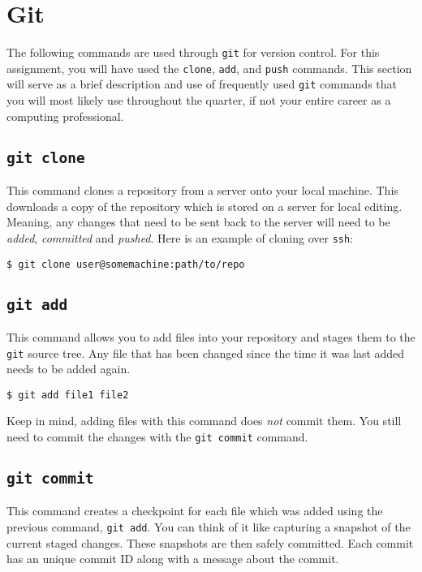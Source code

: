 \documentclass[11pt]{article}
\begin{document}
\section{Git}

The following commands are used through \texttt{git} for version control. For
this assignment, you will have used the \texttt{clone}, \texttt{add}, and
\texttt{push} commands. This section will serve as a brief description and use
of frequently used \texttt{git} commands that you will most likely use
throughout the quarter, if not your entire career as a computing professional.

\subsection{\texttt{git clone}}

This command clones a repository from a server onto your local machine. This
downloads a copy of the repository which is stored on a server for local
editing. Meaning, any changes that need to be sent back to the server will need
to be \emph{added}, \emph{committed} and \emph{pushed}. Here is an example of
cloning over \texttt{ssh}:

\begin{lstlisting}[style=bashstyle]
  $ git clone user@somemachine:path/to/repo
\end{lstlisting}

\subsection{\texttt{git add}}

This command allows you to add files into your repository and stages them to
the \texttt{git} source tree. Any file that has been changed since the time it was last
added needs to be added again.

\begin{lstlisting}[style=bashstyle]
  $ git add file1 file2
\end{lstlisting}

Keep in mind, adding files with this command does \emph{not} commit them. You
still need to commit the changes with the \texttt{git commit} command.

\subsection{\texttt{git commit}}

This command creates a checkpoint for each file which was added using the
previous command, \texttt{git add}. You can think of it like capturing a
snapshot of the current staged changes. These snapshots are then safely
committed. Each commit has an unique commit ID along with a message about the
commit.
\end{document}

